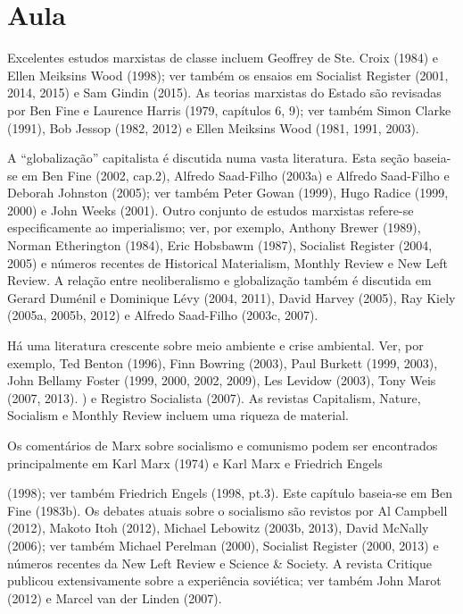 \section{Aula}
 \par 
Excelentes estudos marxistas de classe incluem Geoffrey de Ste. Croix (1984) e Ellen Meiksins Wood (1998); ver também os ensaios em Socialist Register (2001, 2014, 2015) e Sam Gindin (2015). As teorias marxistas do Estado são revisadas por Ben Fine e Laurence Harris (1979, capítulos 6, {\color{blue}9}); ver também Simon Clarke (1991), Bob Jessop (1982, 2012) e Ellen Meiksins Wood (1981, 1991, 2003).
 \par 
A “globalização” capitalista é discutida numa vasta literatura. Esta seção baseia-se em Ben Fine (2002, cap.{\color{blue}2}), Alfredo Saad-Filho (2003a) e Alfredo Saad-Filho e Deborah Johnston (2005); ver também Peter Gowan (1999), Hugo Radice (1999, 2000) e John Weeks (2001). Outro conjunto de estudos marxistas refere-se especificamente ao imperialismo; ver, por exemplo, Anthony Brewer (1989), Norman Etherington (1984), Eric Hobsbawm (1987), Socialist Register (2004, 2005) e números recentes de Historical Materialism, Monthly Review e New Left Review. A relação entre neoliberalismo e globalização também é discutida em Gerard Duménil e Dominique Lévy (2004, 2011), David Harvey (2005), Ray Kiely (2005a, 2005b, 2012) e Alfredo Saad-Filho (2003c, 2007).
 \par 
Há uma literatura crescente sobre meio ambiente e crise ambiental. Ver, por exemplo, Ted Benton (1996), Finn Bowring (2003), Paul Burkett (1999, 2003), John Bellamy Foster (1999, 2000, 2002, 2009), Les Levidow (2003), Tony Weis (2007, 2013). ) e Registro Socialista (2007). As revistas Capitalism, Nature, Socialism e Monthly Review incluem uma riqueza de material.
 \par 
Os comentários de Marx sobre socialismo e comunismo podem ser encontrados principalmente em Karl Marx (1974) e Karl Marx e Friedrich Engels
 \par 
(1998); ver também Friedrich Engels (1998, pt.{\color{blue}3}). Este capítulo baseia-se em Ben Fine (1983b). Os debates atuais sobre o socialismo são revistos por Al Campbell (2012), Makoto Itoh (2012), Michael Lebowitz (2003b, 2013), David McNally (2006); ver também Michael Perelman (2000), Socialist Register (2000, 2013) e números recentes da New Left Review e Science & Society. A revista Critique publicou extensivamente sobre a experiência soviética; ver também John Marot (2012) e Marcel van der Linden (2007).